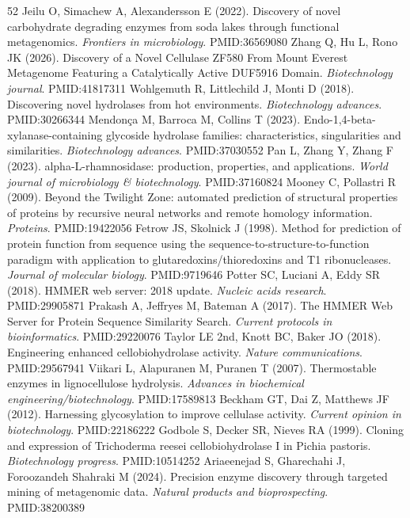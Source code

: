 \documentclass[11pt]{article}
\begin{document}
\begin{thebibliography}{52}
 Jeilu O, Simachew A, Alexandersson E (2022). Discovery of novel carbohydrate degrading enzymes from soda lakes through functional metagenomics. \textit{Frontiers in microbiology}. PMID:36569080
 Zhang Q, Hu L, Rono JK (2026). Discovery of a Novel Cellulase ZF580 From Mount Everest Metagenome Featuring a Catalytically Active DUF5916 Domain. \textit{Biotechnology journal}. PMID:41817311
 Wohlgemuth R, Littlechild J, Monti D (2018). Discovering novel hydrolases from hot environments. \textit{Biotechnology advances}. PMID:30266344
 Mendon\c{c}a M, Barroca M, Collins T (2023). Endo-1,4-beta-xylanase-containing glycoside hydrolase families: characteristics, singularities and similarities. \textit{Biotechnology advances}. PMID:37030552
 Pan L, Zhang Y, Zhang F (2023). alpha-L-rhamnosidase: production, properties, and applications. \textit{World journal of microbiology \& biotechnology}. PMID:37160824
 Mooney C, Pollastri R (2009). Beyond the Twilight Zone: automated prediction of structural properties of proteins by recursive neural networks and remote homology information. \textit{Proteins}. PMID:19422056
 Fetrow JS, Skolnick J (1998). Method for prediction of protein function from sequence using the sequence-to-structure-to-function paradigm with application to glutaredoxins/thioredoxins and T1 ribonucleases. \textit{Journal of molecular biology}. PMID:9719646
 Potter SC, Luciani A, Eddy SR (2018). HMMER web server: 2018 update. \textit{Nucleic acids research}. PMID:29905871
 Prakash A, Jeffryes M, Bateman A (2017). The HMMER Web Server for Protein Sequence Similarity Search. \textit{Current protocols in bioinformatics}. PMID:29220076
 Taylor LE 2nd, Knott BC, Baker JO (2018). Engineering enhanced cellobiohydrolase activity. \textit{Nature communications}. PMID:29567941
 Viikari L, Alapuranen M, Puranen T (2007). Thermostable enzymes in lignocellulose hydrolysis. \textit{Advances in biochemical engineering/biotechnology}. PMID:17589813
 Beckham GT, Dai Z, Matthews JF (2012). Harnessing glycosylation to improve cellulase activity. \textit{Current opinion in biotechnology}. PMID:22186222
 Godbole S, Decker SR, Nieves RA (1999). Cloning and expression of Trichoderma reesei cellobiohydrolase I in Pichia pastoris. \textit{Biotechnology progress}. PMID:10514252
 Ariaeenejad S, Gharechahi J, Foroozandeh Shahraki M (2024). Precision enzyme discovery through targeted mining of metagenomic data. \textit{Natural products and bioprospecting}. PMID:38200389

\end{thebibliography}
\end{document}
